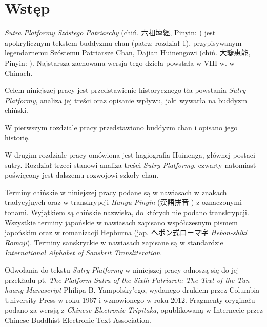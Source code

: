 \chapter*{Wstęp}
\renewcommand{\headrulewidth}{0.3pt}

\textit{Sutra Platformy Szóstego Patriarchy} (chiń. 六祖壇經, Pinyin: ) jest apokryficznym tekstem buddyzmu chan (patrz: rozdział 1), przypisywanym legendarnemu Szóstemu Patriarsze Chan, Dajian Huinengowi (chiń. 大鑒惠能, Pinyin: ). Najstarsza zachowana wersja tego dzieła powstała w VIII w. w Chinach.

Celem niniejszej pracy jest przedstawienie historycznego tła powstania \textit{Sutry Platformy}, analiza jej treści oraz opisanie wpływu, jaki wywarła na buddyzm chiński.

W pierwszym rozdziale pracy przedstawiono buddyzm chan i opisano jego historię.

W drugim rozdziale pracy omówiona jest hagiografia Huinenga, głównej postaci sutry.
Rozdział trzeci stanowi analiza treści \textit{Sutry Platformy}, czwarty natomiast poświęcony jest dalszemu rozwojowi szkoły chan.

Terminy chińskie w niniejszej pracy podane są w nawiasach w znakach tradycyjnych oraz w transkrypcji \textit{Hanyu Pinyin} (漢語拼音 ) z oznaczonymi tonami. Wyjątkiem są chińskie nazwiska, do których nie podano transkrypcji.
Wszystkie terminy japońskie w nawiasach zapisano współczesnym pismem japońskim oraz w romanizacji Hepburna (jap. {\ipaexgothic ヘボン式ローマ字} \textit{Hebon-shiki Rōmaji}).
Terminy sanskryckie w nawiasach zapisane są w standardzie \textit{International Alphabet of Sanskrit Transliteration}.

Odwołania do tekstu \textit{Sutry Platformy} w niniejszej pracy odnoszą się do jej przekładu pt. \textit{The Platform Sutra of the Sixth Patriarch: The Text of the Tun-huang Manuscript} Philipa B. Yampolsky'ego, wydanego drukiem przez Columbia University Press w roku 1967 i wznowionego w roku 2012.
Fragmenty oryginału podano za wersją z \textit{Chinese Electronic Tripitaka}, opublikowaną w Internecie przez Chinese Buddhist Electronic Text Association.
